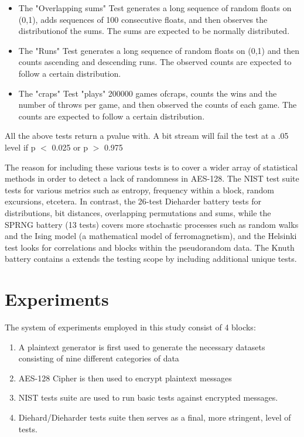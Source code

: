 \documentclass[conference]{IEEEtran}
\begin{document}
\begin{itemize}
  \item The "Overlapping sums" Test generates a long sequence of random floats on (0,1), adds sequences of 100 consecutive floats, and then observes the distributionof the sums.  The sums are expected to be normally distributed.
  \item The "Runs" Test generates a long sequence of random floats on (0,1) and then counts ascending and descending runs. The observed counts are expected to follow a certain distribution.
  \item The "craps" Test "plays" 200000 games ofcraps, counts the wins and the number of throws per game, and then observed the counts of each game. The counts are expected to follow a certain distribution.
  
 \end{itemize}
  
All the above tests return a pvalue with. A bit stream will fail the test at a .05 level if p $<$ 0.025 or p $>$ 0.975

The reason for including these various tests is to cover a wider array of statistical methods in order to detect a lack of randomness in AES-128. The NIST test suite tests for various metrics such as entropy, frequency within a block, random excursions, etcetera. In contrast, the 26-test Dieharder battery tests for distributions, bit distances, overlapping permutations and sums, while the SPRNG battery (13 tests) covers more stochastic processes such as random walks and the Ising model (a
mathematical model of ferromagnetism), and the Helsinki test looks for correlations and blocks within the pseudorandom data. The Knuth battery contains a extends the testing scope by including additional unique tests. 

\section{Experiments}

The system of experiments employed in this study consist of 4 blocks:

\begin{enumerate}
  \item A plaintext generator is first used to  generate the necessary datasets consisting of nine different categories of data
  \item AES-128 Cipher  is then used  to encrypt plaintext messages
  \item NIST tests suite are used to run basic tests against encrypted messages.
  \item Diehard/Dieharder tests suite then serves as a final, more stringent, level of tests. 
\end{enumerate}
\end{document}
